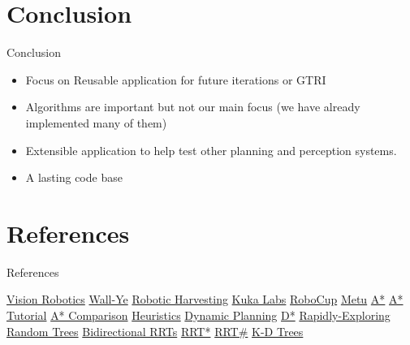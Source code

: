 \documentclass[pdf]{beamer}
\begin{document}
\section{Conclusion}
\begin{frame}{Conclusion}
  \begin{itemize}
  \item Focus on Reusable application for future iterations or GTRI
  \item Algorithms are important but not our main focus (we have already implemented many of them)
  \item Extensible application to help test other planning and perception systems. 
  \item A lasting code base
  \end{itemize}
\end{frame}
\section*{References}
\begin{frame}[allowframebreaks]{References}
  \begin{thebibliography}{20}
   \href{http://visionrobotics.com/vrc/index.php?option=com_zoom&Itemid=26&catid=6}{Vision Robotics}
   \href{http://wall-ye.com/}{Wall-Ye}
   \href{http://www.roboticharvesting.com/products.html}{Robotic Harvesting}
   \href{http://www.kuka-labs.com/en/service_robotics/research_education/youbot/}{Kuka Labs}
   \href{http://www.robocupatwork.org/download/RoboCup-At-Work_Camp_2012/RAW_Camp2012-Jan-Paulus_youBotAPI.pdf}{RoboCup}
   \href{http://www.eee.metu.edu.tr/~ee402/2013/EE402RecitationReport_4.pdf}{Metu}
   \href{http://en.wikipedia.org/wiki/A*_search_algorithm}{A*}
   \href{http://www.policyalmanac.org/games/aStarTutorial.htm}{A* Tutorial}
   \href{http://theory.stanford.edu/~amitp/GameProgramming/AStarComparison.html}{A* Comparison}
   \href{http://www.policyalmanac.org/games/heuristics.htm}{Heuristics}
   \href{http://www.frc.ri.cmu.edu/~axs/dynamic_plan.html}{Dynamic Planning}
   \href{http://en.wikipedia.org/wiki/D*}{D*}
   \href{http://msl.cs.uiuc.edu/rrt/papers.html}{Rapidly-Exploring Random Trees}
   \href{http://people.csail.mit.edu/aperez/obirrt/}{Bidirectional RRTs}
   \href{http://sertac.scripts.mit.edu/web/?page_id=15}{RRT*}
   \href{http://ieeexplore.ieee.org/xpl/login.jsp?tp=&arnumber=6630906&url=http://ieeexplore.ieee.org/iel7/6615630/6630547/06630906.pdf?arnumber=6630906}{RRT\#}
   \href{https://www.cise.ufl.edu/class/cot5520fa09/CG_RangeKDtrees.pdf}{K-D Trees}
    \end{thebibliography}
\end{frame}
\end{document}

